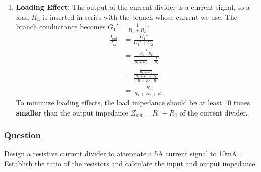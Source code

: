 \begin{enumerate}
    \paragraph{At Output:} Looking into the \(G_1\) branch with \(I_{in}\)
    opened, \(G_1\) is in series with \(G_2\):
      \begin{align*}
        Z_{out} &= \frac{1}{G_1} + \frac{1}{G_2} \\
        Z_{out} &= R_1 + R_2 \hspace{1cm} \text{(Substituting \(G_1 = \frac{1}{R_1}\) and \(G_2 = \frac{1}{R_2}\))}
      \end{align*}
  \item \textbf{Loading Effect:}
    The output of the current divider is a current signal, so a load
    \(R_L\) is inserted in series with the branch whose current we use.
    The branch conductance becomes \(G_1' = \frac{1}{R_1 + R_L}\):
    \begin{align*}
      \frac{I_{out}}{I_{in}} &= \frac{G_1'}{G_1' + G_2} \\
      &= \frac{\frac{1}{R_1 + R_L}}{\frac{1}{R_1 + R_L} + \frac{1}{R_2}} \\
      &= \frac{\frac{1}{R_1 + R_L}}{\frac{R_2 + R_1 + R_L}{(R_1 + R_L) R_2}} \\
      &= \frac{R_2}{R_1 + R_2 + R_L}
    \end{align*}
    To minimize loading effects, the load impedance should be at least
    10 times \textbf{smaller} than the output impedance
    \(Z_{out} = R_1 + R_2\) of the current divider.
\end{enumerate}

\subsubsection{Question}
Design a resistive current divider to attenuate a 5A current signal to
10mA. Establish the ratio of the resistors and calculate the input
and output impedance.
